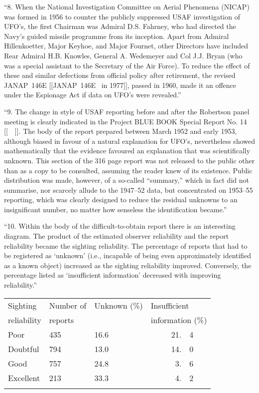 \begin{svgraybox}
``8. When the National Investigation Committee on Aerial Phenomena
(NICAP) was formed in 1956 to counter the publicly suppressed USAF
investigation of UFO's, the first Chairman was Admiral D.S. Fahrney,
who had directed the Navy's guided missile programme from its
inception. Apart from Admiral Hillenkoetter, Major Keyhoe, and
Major Fournet, other Directors have included Rear Admiral H.B. Knowles,
General A. Wedemeyer and Col J.J. Bryan (who was a special assistant
to the Secretary of the Air Force). To reduce the effect of these
and similar defections from official policy after retirement, the
revised JANAP~146E
[[JANAP~146E~\cite{JANAP_146E} in 1977]], passed in 1960, made it an offence under the
Espionage Act if data on UFO's were revealed.''

``9. The change in style of USAF reporting before and after the
Robertson panel meeting is clearly indicated in the Project BLUE BOOK
Special Report No. 14 [[~\cite{BlueBookSR14-1955}~]]. The body of the report prepared between
March 1952 and early 1953, although biased in favour of a natural
explanation for UFO's, nevertheless showed mathematically that the
evidence favoured an explanation that was scientifically unknown.
This section of the 316 page report was not released to the public
other than as a copy to be consulted, assuming the reader knew of
its existence. Public distribution was made, however, of a so-called
``summary,'' which in fact did not summarise, nor scarcely
allude to the 1947--52 data, but concentrated on 1953--55 reporting,
which was clearly designed to reduce the residual unknowns to an
insignificant number, no matter how senseless the identification
became.''

``10. Within the body of the difficult-to-obtain report there
is an interesting diagram. The product of the estimated observer
reliability and the report reliability became the sighting
reliability. The percentage of reports that had to be registered
as `unknown' (i.e., incapable of being even approximately identified
as a known object) increased as the sighting reliability improved.
Conversely, the percentage listed as `insufficient information'
decreased with improving reliability.''

\begin{center}
\setlength\tabcolsep{6pt}
\begin{tabular}{ l l l r@{}l}
\hline\noalign{\smallskip}
Sighting&Number of&Unknown (\%)&\multicolumn{2}{l}{Insufficient}\\[-1pt]
reliability&reports& & \multicolumn{2}{l}{information (\%)}\\\noalign{\smallskip}\hline\noalign{\smallskip}
Poor & 435         &  16.6  &     21.&4 \\
Doubtful & 794     &  13.0  &    14.&0  \\
Good & 757         &  24.8  &    3.&6   \\
Excellent & 213    &  33.3  &   4.&2    \\\noalign{\smallskip}\hline\noalign{\smallskip}
\end{tabular}
\end{center}





\end{svgraybox}

